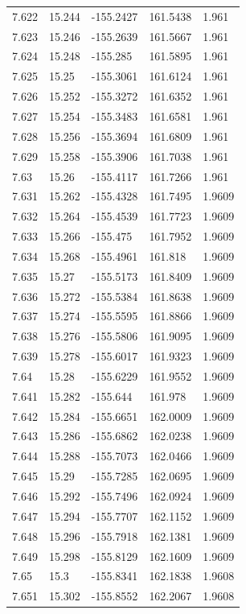 \begin{tabular}{lllll}
7.622 & 15.244 & -155.2427 & 161.5438 & 1.961 \\
7.623 & 15.246 & -155.2639 & 161.5667 & 1.961 \\
7.624 & 15.248 & -155.285 & 161.5895 & 1.961 \\
7.625 & 15.25 & -155.3061 & 161.6124 & 1.961 \\
7.626 & 15.252 & -155.3272 & 161.6352 & 1.961 \\
7.627 & 15.254 & -155.3483 & 161.6581 & 1.961 \\
7.628 & 15.256 & -155.3694 & 161.6809 & 1.961 \\
7.629 & 15.258 & -155.3906 & 161.7038 & 1.961 \\
7.63 & 15.26 & -155.4117 & 161.7266 & 1.961 \\
7.631 & 15.262 & -155.4328 & 161.7495 & 1.9609 \\
7.632 & 15.264 & -155.4539 & 161.7723 & 1.9609 \\
7.633 & 15.266 & -155.475 & 161.7952 & 1.9609 \\
7.634 & 15.268 & -155.4961 & 161.818 & 1.9609 \\
7.635 & 15.27 & -155.5173 & 161.8409 & 1.9609 \\
7.636 & 15.272 & -155.5384 & 161.8638 & 1.9609 \\
7.637 & 15.274 & -155.5595 & 161.8866 & 1.9609 \\
7.638 & 15.276 & -155.5806 & 161.9095 & 1.9609 \\
7.639 & 15.278 & -155.6017 & 161.9323 & 1.9609 \\
7.64 & 15.28 & -155.6229 & 161.9552 & 1.9609 \\
7.641 & 15.282 & -155.644 & 161.978 & 1.9609 \\
7.642 & 15.284 & -155.6651 & 162.0009 & 1.9609 \\
7.643 & 15.286 & -155.6862 & 162.0238 & 1.9609 \\
7.644 & 15.288 & -155.7073 & 162.0466 & 1.9609 \\
7.645 & 15.29 & -155.7285 & 162.0695 & 1.9609 \\
7.646 & 15.292 & -155.7496 & 162.0924 & 1.9609 \\
7.647 & 15.294 & -155.7707 & 162.1152 & 1.9609 \\
7.648 & 15.296 & -155.7918 & 162.1381 & 1.9609 \\
7.649 & 15.298 & -155.8129 & 162.1609 & 1.9609 \\
7.65 & 15.3 & -155.8341 & 162.1838 & 1.9608 \\
7.651 & 15.302 & -155.8552 & 162.2067 & 1.9608 \\

\end{tabular}
